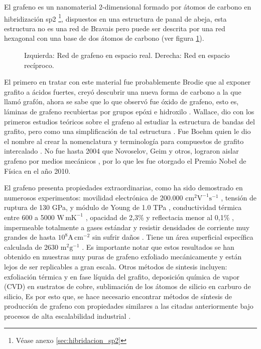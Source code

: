 
El grafeno es un nanomaterial 2-dimensional formado por átomos de carbono en hibridización sp2 \footnote{Véase anexo \ref{sec:hibridacion_sp2}}, dispuestos en una estructura de panal de abeja, esta estructura no es una red de Bravais pero puede ser descrita por una red hexagonal con una base de dos átomos de carbono (ver figura \ref{fig_graphene_lattice}). 

\begin{figure}
	\centering
	\caption[Estructura del grafeno]{Izquierda: Red de grafeno en espacio real. Derecha: Red en espacio recíproco.}
	\label{fig_graphene_lattice}
\end{figure}

El primero en tratar con este material fue probablemente Brodie \citep{Brodie1859} que al exponer grafito a ácidos fuertes, creyó descubrir una nueva forma de carbono a la que llamó grafón, ahora se sabe que lo que observó fue óxido de grafeno, esto es, láminas de grafeno recubiertas por grupos epóxi e hidroxilo \citep{Geim2012}. Wallace, dio con los primeros estudios teóricos sobre el grafeno al estudiar la estructura de bandas del grafito, pero como una simplificación de tal estructura \citep{Wallace1947}. Fue Boehm quien le dio el nombre al crear la nomenclatura y terminología para compuestos de grafito intercalado \citep{Boehm1986}. No fue hasta 2004 que Novoselov, Geim y otros, lograron aislar grafeno por medios mecánicos \citep{Novoselov2004}, por lo que les fue otorgado el Premio Nobel de Física en el año 2010.

El grafeno presenta propiedades extraordinarias, como ha sido demostrado en numerosos experimentos: movilidad electrónica de 200.000 $\mathrm{cm^2 V^{-1} s^{-1} }$ \citep{Bolotin2008}, tensión de ruptura de 130 GPa, y módulo de Young de 1.0 TPa \citep{Lee2008}, conductividad térmica entre 600 a 5000 $\mathrm{W\, mK^{-1}}$ \citep{Balandin2011}, opacidad de 2,3\% y reflectacia menor al 0,1\% \citep{Nair2008}, impermeable totalmente a gases estándar \citep{Bunch2008} y resistir densidades de corriente muy grandes de hasta $\mathrm{10^8 A\, cm^{-2}}$ sin sufrir daños  \citep{Moser2007}. Tiene un área superficial específica calculada de 2630 $\mathrm{m^2 g^{-1}}$ \citep{Peigney2001}. Es importante notar que estos resultados se han obtenido en muestras muy puras de grafeno exfoliado mecánicamente \citep{Novoselov2004} y están lejos de ser replicables a gran escala. Otros métodos de sintesis incluyen: exfoliación térmica y en fase líquida del grafito\citep{Blake2008}, deposición química de vapor (CVD) en sustratos de cobre, sublimación de los átomos de silicio en carburo de silicio\citep{DeHeer2011a},   Es por esto que, se hace necesario encontrar métodos de síntesis de producción de grafeno con propiedades similares a las citadas anteriormente bajo procesos de alta escalabilidad industrial \citep{Novoselov2012}.

